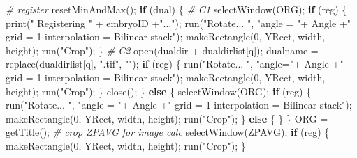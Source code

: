 \documentclass[10pt, b5paper, singlespacinge, twoside]{reedthesis} %
\newenvironment{Shaded}{}{}
\newcommand{\CommentTok}[1]{\textit{#1}}
\newcommand{\ControlFlowTok}[1]{\textbf{#1}}
\newcommand{\DecValTok}[1]{#1}
\newcommand{\FunctionTok}[1]{#1}
\newcommand{\NormalTok}[1]{#1}
\newcommand{\OtherTok}[1]{#1}
\newcommand{\SpecialCharTok}[1]{#1}
\newcommand{\StringTok}[1]{#1}
\theoremstyle{definition}
\theoremstyle{definition}
\theoremstyle{definition}
\theoremstyle{remark}
\begin{document}
\begin{Shaded}
\begin{Highlighting}[numbers=left,,]
    \CommentTok{\# register}
        \FunctionTok{resetMinAndMax}\NormalTok{();}
        \ControlFlowTok{if}\NormalTok{ (dual) \{}
        \CommentTok{\#   C1}
            \FunctionTok{selectWindow}\NormalTok{(ORG);}
            \ControlFlowTok{if}\NormalTok{ (reg) \{}
                \FunctionTok{print}\NormalTok{(}\StringTok{"  Registering "} \SpecialCharTok{+}\NormalTok{ embryoID }\SpecialCharTok{+}\StringTok{"..."}\NormalTok{);}
                \FunctionTok{run}\NormalTok{(}\StringTok{"Rotate... "}\NormalTok{, }
                    \StringTok{"angle = "}\SpecialCharTok{+}\NormalTok{ Angle }\SpecialCharTok{+}\StringTok{" grid = 1 interpolation = Bilinear stack"}\NormalTok{);}
                \FunctionTok{makeRectangle}\NormalTok{(}\DecValTok{0}\NormalTok{, YRect, width, height);}
                \FunctionTok{run}\NormalTok{(}\StringTok{"Crop"}\NormalTok{);}
\NormalTok{            \}}
        \CommentTok{\# C2}
            \FunctionTok{open}\NormalTok{(dualdir }\SpecialCharTok{+}\NormalTok{ dualdirlist[q]);}
\NormalTok{            dualname }\OtherTok{=} \FunctionTok{replace}\NormalTok{(dualdirlist[q], }\StringTok{".tif"}\NormalTok{, }\StringTok{""}\NormalTok{);}
            \ControlFlowTok{if}\NormalTok{ (reg) \{}
                \FunctionTok{run}\NormalTok{(}\StringTok{"Rotate... "}\NormalTok{,}
                    \StringTok{"angle="}\SpecialCharTok{+}\NormalTok{ Angle }\SpecialCharTok{+}\StringTok{" grid = 1 interpolation = Bilinear stack"}\NormalTok{);}
                \FunctionTok{makeRectangle}\NormalTok{(}\DecValTok{0}\NormalTok{, YRect, width, height);}
                \FunctionTok{run}\NormalTok{(}\StringTok{"Crop"}\NormalTok{);}
\NormalTok{            \}}
            \FunctionTok{close}\NormalTok{();}
\NormalTok{        \} }\ControlFlowTok{else}\NormalTok{ \{}
            \FunctionTok{selectWindow}\NormalTok{(ORG);}
            \ControlFlowTok{if}\NormalTok{ (reg) \{}
                \FunctionTok{run}\NormalTok{(}\StringTok{"Rotate... "}\NormalTok{,}
                    \StringTok{"angle = "}\SpecialCharTok{+}\NormalTok{ Angle }\SpecialCharTok{+}\StringTok{" grid = 1 interpolation = Bilinear stack"}\NormalTok{);}
                \FunctionTok{makeRectangle}\NormalTok{(}\DecValTok{0}\NormalTok{, YRect, width, height);}
                \FunctionTok{run}\NormalTok{(}\StringTok{"Crop"}\NormalTok{);}
\NormalTok{            \} }\ControlFlowTok{else}\NormalTok{ \{    }
\NormalTok{            \}}
\NormalTok{        \}}
\NormalTok{        ORG }\OtherTok{=} \FunctionTok{getTitle}\NormalTok{();}
    \CommentTok{\# crop ZPAVG for image calc}
        \FunctionTok{selectWindow}\NormalTok{(ZPAVG);}
        \ControlFlowTok{if}\NormalTok{ (reg) \{}
        \FunctionTok{makeRectangle}\NormalTok{(}\DecValTok{0}\NormalTok{, YRect, width, height);}
        \FunctionTok{run}\NormalTok{(}\StringTok{"Crop"}\NormalTok{);}
\NormalTok{        \}}
\end{Highlighting}
\end{Shaded}
\normalsize
\end{document}
